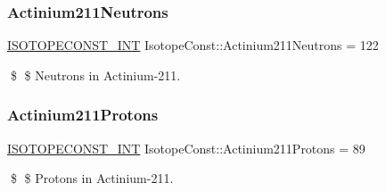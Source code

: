 \subsubsection{\texorpdfstring{Actinium211\+Neutrons}{Actinium211Neutrons}}
{\footnotesize\ttfamily \mbox{\hyperlink{group___isotope_const-_macros_ga5f18360b3e99483a35c32d789e62621c}{I\+S\+O\+T\+O\+P\+E\+C\+O\+N\+S\+T\+\_\+\+I\+NT}} Isotope\+Const\+::\+Actinium211\+Neutrons = 122}

\$ \$ Neutrons in Actinium-\/211. \mbox{\label{group___isotope_const-_actinium-_ac211_ga5edd79db0e963c6ee5753a287bf7f771}} 
\subsubsection{\texorpdfstring{Actinium211\+Protons}{Actinium211Protons}}
{\footnotesize\ttfamily \mbox{\hyperlink{group___isotope_const-_macros_ga5f18360b3e99483a35c32d789e62621c}{I\+S\+O\+T\+O\+P\+E\+C\+O\+N\+S\+T\+\_\+\+I\+NT}} Isotope\+Const\+::\+Actinium211\+Protons = 89}

\$ \$ Protons in Actinium-\/211. 